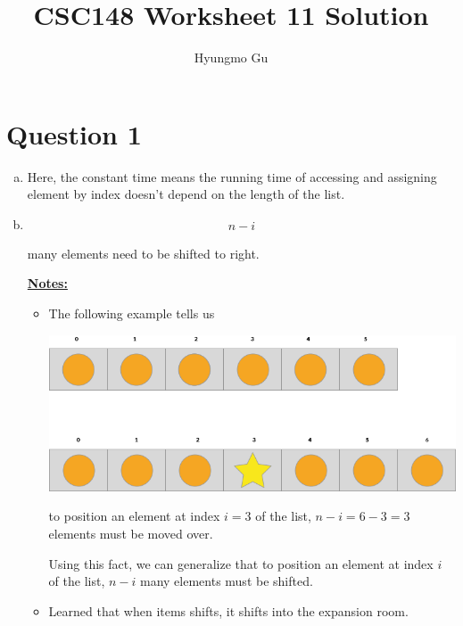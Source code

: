 \documentclass[12pt]{article}
\begin{document}
\title{CSC148 Worksheet 11 Solution}
\author{Hyungmo Gu}
\maketitle

\section*{Question 1}
\begin{enumerate}[a.]
    \item Here, the constant time means the running time of accessing and
    assigning element by index doesn't depend on the length of the list.

    \item

    \begin{align*}
        n -i
    \end{align*}

    many elements need to be shifted to right.

    \bigskip

    \underline{\textbf{Notes:}}

    \bigskip

    \begin{itemize}
        \item

        The following example tells us

        \begin{center}
        \includegraphics[width=0.8 \linewidth]{images/worksheet_11_q1b_notes.png}
        \end{center}

        to position an element at index $i = 3$ of the list, $n - i = 6 - 3 = 3$
        elements must be moved over.

        \bigskip

        Using this fact, we can generalize that to position an element at index $i$
        of the list, $n - i$ many elements must be shifted.

        \item Learned that when items shifts, it shifts into the expansion room.


\end{itemize}
\end{enumerate}
\end{document}
